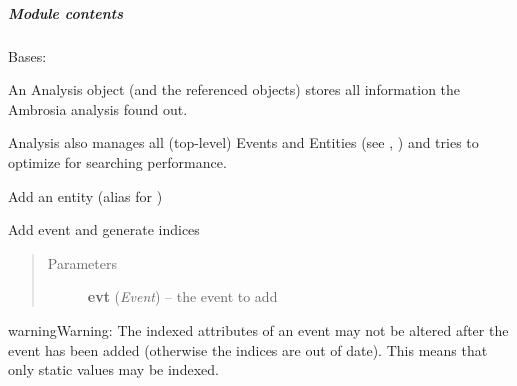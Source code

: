 \documentclass[letterpaper,10pt,english]{sphinxmanual}
\begin{document}
\subparagraph{Module contents}
\label{ambrosia.model:module-ambrosia.model}\label{ambrosia.model:module-contents}

\begin{fulllineitems}
\label{ambrosia.model:ambrosia.model.Analysis}
Bases: 

An Analysis object (and the referenced objects) stores all information the Ambrosia analysis found out.

Analysis also manages all (top-level) Events and Entities (see ,
) and tries to optimize for searching performance.

\begin{fulllineitems}
\label{ambrosia.model:ambrosia.model.Analysis.add_entity}
Add an entity (alias for {\hyperref[ambrosia.model:ambrosia.model.Analysis.get_entity]{}})

\end{fulllineitems}


\begin{fulllineitems}
\label{ambrosia.model:ambrosia.model.Analysis.add_event}
Add event and generate indices
\begin{quote}\begin{description}
\item[{Parameters}] \leavevmode
\textbf{evt} (\emph{Event}) -- the event to add

\end{description}\end{quote}

\begin{notice}{warning}{Warning:}
The indexed attributes of an event may not be altered after the event has been added (otherwise the indices
are out of date). This means that only static values may be indexed.
\end{notice}

\end{fulllineitems}



\end{fulllineitems}
\end{document}
